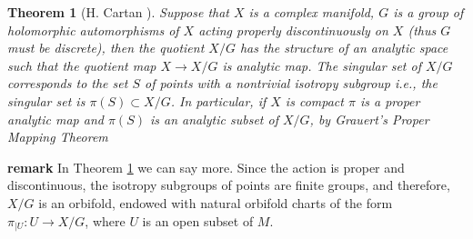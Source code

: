 \documentclass[12pt,twoside,a4paper]{report}
\newtheorem{theorem}{Theorem}[section]
\begin{document}
  \begin{theorem}[H. Cartan \cite{Cartan}]\label{Cartan} Suppose that $X$ is a complex manifold, $G$ is a group of holomorphic automorphisms of $X$ acting properly discontinuously on $X$ (thus $G$ must be discrete), then the quotient $X/G$ has the structure of an analytic space such that the quotient map $X\to{X/G}$ is analytic map. The singular set of $X/G$ corresponds to the set $S$ of points with a nontrivial isotropy subgroup {\it i.e.,} the singular set is
  $\pi(S)\subset {X/G}$. In particular, if $X$ is compact $\pi$ is a proper analytic map and
  $\pi(S)$ is an analytic subset of $X/G$, by Grauert's Proper Mapping Theorem \cite{Grauert}
  \end{theorem}

  \textbf{remark} \label{orbifold} In Theorem \ref{Cartan} we can say more. Since the action is
  proper and discontinuous, the isotropy subgroups of points are finite groups, and
  therefore, $X/G$ is an orbifold, endowed with natural orbifold charts of the form
  $\pi_{|U}:U\to{X/G}$, where $U$ is an open subset of $M$.
\end{document}
